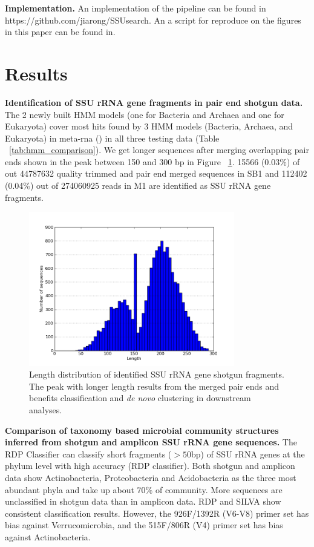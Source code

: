 \documentclass[12pt]{article}
\begin{document}
{\bf Implementation. } An implementation of the pipeline can be found
in https://github.com/jiarong/SSUsearch. An a script for reproduce on
the figures in this paper can be found in.

\section{Results}

{\bf Identification of SSU rRNA gene fragments in pair end shotgun
data. } The 2 newly built HMM models (one for Bacteria and Archaea and
one for Eukaryota) cover most hits found by 3 HMM models (Bacteria,
Archaea, and Eukaryota) in meta-rna (\cite{metarna}) in all three
testing data (Table ~\ref{tab:hmm_comparison}). We get longer
sequences after merging overlapping pair ends shown in the peak
between 150 and 300 bp in Figure ~\ref{fig:read_length_dist}. 15566
(0.03\%) of out 44787632 quality trimmed and pair end merged sequences
in SB1 and 112402 (0.04\%) out of 274060925 reads in M1 are identified
as SSU rRNA gene fragments.

    \begin{figure}[tbph!]
    \centering
    \includegraphics[width=0.8\textwidth]{figs/read_length_dist.png}

    \caption[Length distribution of identified SSU rRNA gene shotgun
    fragments]{Length distribution of identified SSU rRNA gene shotgun
    fragments. The peak with longer length results from the merged
    pair ends and benefits classification and {\em de novo} clustering
    in downstream analyses.}

    \label{fig:read_length_dist}
    \end{figure}

{\bf Comparison of taxonomy based microbial community structures
inferred from shotgun and amplicon SSU rRNA gene sequences. } The RDP
Classifier can classify short fragments ($>50$bp) of SSU rRNA genes at
the phylum level with high accuracy (RDP classifier). Both shotgun and
amplicon data show Actinobacteria, Proteobacteria and Acidobacteria as
the three most abundant phyla and take up about 70\% of
community. More sequences are unclassified in shotgun data than in
amplicon data. RDP and SILVA show consistent classification
results. However, the 926F/1392R (V6-V8) primer set has bias against
Verrucomicrobia, and the 515F/806R (V4) primer set has bias against
Actinobacteria.
\end{document}
